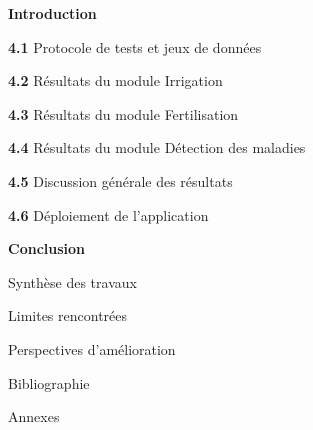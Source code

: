\documentclass[12pt,a4paper]{report}
\begin{document}
	\vspace{3pt}
	\begin{list}{}{%
			\setlength{\leftmargin}{0pt}
			\setlength{\itemsep}{2pt}
		}
		\item \textbf{Introduction} \dotfill 
		
		\vspace{4pt}
		\item \textbf{4.1} \quad Protocole de tests et jeux de donn\'ees \dotfill 
	
		\vspace{4pt}
		\item \textbf{4.2} \quad R\'esultats du module Irrigation \dotfill 
	
		
		\vspace{4pt}
		\item \textbf{4.3} \quad R\'esultats du module Fertilisation \dotfill 
		
		\vspace{4pt}
		\item \textbf{4.4} \quad R\'esultats du module D\'etection des maladies \dotfill 
		
		
		\vspace{4pt}
		\item \textbf{4.5} \quad Discussion g\'en\'erale des r\'esultats \dotfill 
		
		\vspace{4pt}
		\item \textbf{4.6} \quad D\'eploiement de l'application \dotfill 
		
		
		\vspace{4pt}
		\item \textbf{Conclusion} \dotfill 
	\end{list}
	
	\vspace{0.8cm}
	
	
	\noindent
	\colorbox{bleuPrincipal}{%
		\parbox{\linewidth}{%
			\vspace{3pt}
			\hfill{\color{white}\bfseries }
			\vspace{3pt}
		}%
	}
	
	\begin{list}{}{%
			\setlength{\leftmargin}{1.5em}
			\setlength{\itemsep}{2pt}
		}
		
		\item Synthèse des travaux
		
		\item Limites rencontrées
		
		\item Perspectives d’amélioration
		
		\item Bibliographie
		
		\item Annexes
		
		
	\end{list}
	\vspace{0.8cm}
	
\end{document}
